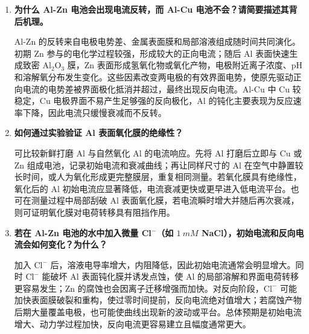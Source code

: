 \documentclass[11pt]{article}
\begin{document}
\begin{enumerate}
    \item \textbf{为什么 Al-Zn 电池会出现电流反转，而 Al-Cu 电池不会？请简要描述其背后机理。}

    Al-Zn 的反转来自电极电势差、金属表面膜和局部溶液组成随时间共同演化。初期 Zn 参与的电化学过程较强，形成较大的正向电流；随后 Al 表面快速生成致密 $\mathrm{Al_2O_3}$ 膜，Zn 表面形成氢氧化物或氧化产物，电极附近离子浓度、pH 和溶解氧分布发生变化。这些因素改变两电极的有效界面电势，使原先驱动正向电流的电势差被界面极化抵消并超过，最终出现反向电流。Al-Cu 中 Cu 较稳定，Cu 电极界面不易产生足够强的反向极化，Al 的钝化主要表现为反应速率下降，因此电流只缓慢衰减而不反转。

    \item \textbf{如何通过实验验证 Al 表面氧化膜的绝缘性？}

    可比较新鲜打磨 Al 与自然氧化 Al 的电流响应。先将 Al 打磨后立即与 Cu 或 Zn 组成电池，记录初始电流和衰减曲线；再让同样尺寸的 Al 在空气中静置较长时间，或人为氧化形成更完整膜层，重复相同测量。若氧化膜具有绝缘性，氧化后的 Al 初始电流应显著降低，电流衰减更快或更早进入低电流平台。也可在测量过程中局部刮破 Al 表面氧化膜，若电流瞬时增大并随后再次衰减，则可证明氧化膜对电荷转移具有阻挡作用。

    \item \textbf{若在 Al-Zn 电池的水中加入微量 Cl$^-$（如 $\SI{1}{mM}$ NaCl），初始电流和反向电流会如何变化？为什么？}

    加入 $\mathrm{Cl^-}$ 后，溶液电导率增大，内阻降低，因此初始电流通常会明显增大。同时 $\mathrm{Cl^-}$ 能破坏 Al 表面钝化膜并诱发点蚀，使 Al 的局部溶解和界面电荷转移更容易发生；Zn 的腐蚀也会因离子迁移增强而加快。对反向阶段，$\mathrm{Cl^-}$ 可能加快表面膜破裂和重构，使过零时间提前，反向电流绝对值增大；若腐蚀产物后期大量覆盖电极，也可能使曲线出现新的波动或平台。总体预期是初始电流增大、动力学过程加快，反向电流更容易建立且幅度通常更大。
\end{enumerate}
\end{document}
